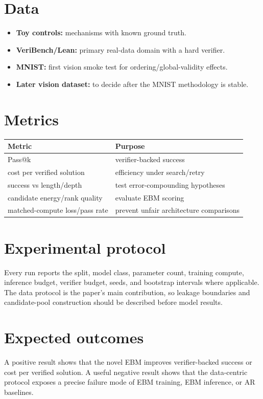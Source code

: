 \documentclass[11pt]{article}
\begin{document}
\section{Data}

\begin{itemize}[leftmargin=2em]
  \item \textbf{Toy controls:} mechanisms with known ground truth.
  \item \textbf{VeriBench/Lean:} primary real-data domain with a hard verifier.
  \item \textbf{MNIST:} first vision smoke test for ordering/global-validity effects.
  \item \textbf{Later vision dataset:} to decide after the MNIST methodology is
        stable.
\end{itemize}

\section{Metrics}

\begin{center}
\begin{tabular}{ll}
\toprule
Metric & Purpose \\
\midrule
Pass@k & verifier-backed success \\
cost per verified solution & efficiency under search/retry \\
success vs length/depth & test error-compounding hypotheses \\
candidate energy/rank quality & evaluate EBM scoring \\
matched-compute loss/pass rate & prevent unfair architecture comparisons \\
\bottomrule
\end{tabular}
\end{center}

\section{Experimental protocol}

Every run reports the split, model class, parameter count, training compute,
inference budget, verifier budget, seeds, and bootstrap intervals where
applicable.
The data protocol is the paper's main contribution, so leakage boundaries and
candidate-pool construction should be described before model results.

\section{Expected outcomes}

A positive result shows that the novel EBM improves verifier-backed success or
cost per verified solution.
A useful negative result shows that the data-centric protocol exposes a precise
failure mode of EBM training, EBM inference, or AR baselines.
\end{document}
